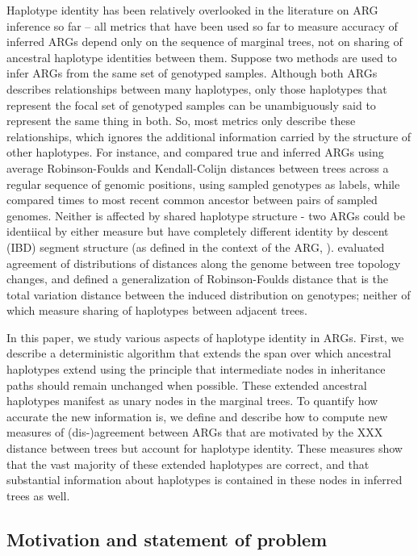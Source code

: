 \documentclass[10pt,twoside,lineno]{gsajnl}
\begin{document}
Haplotype identity has been relatively overlooked in the literature on ARG inference so far --
all metrics that have been used so far to measure accuracy of inferred ARGs
depend only on the sequence of marginal trees,
not on sharing of ancestral haplotype identities between them.
Suppose two methods are used to infer ARGs from the same set of genotyped samples.
Although both ARGs describes relationships between many haplotypes,
only those haplotypes that represent the focal set of genotyped samples
can be unambiguously said to represent the same thing in both.
So, most metrics only describe these relationships,
which ignores the additional information carried by the structure of other haplotypes.
For instance, \citet{kelleher2019inferring} and \citet{zhang2023biobankscale}
compared true and inferred ARGs
using average Robinson-Foulds and Kendall-Colijn distances between trees
across a regular sequence of genomic positions,
using sampled genotypes as labels,
while \citet{brandt2022evaluation} compared times to most recent common ancestor
between pairs of sampled genomes.
Neither is affected by shared haplotype structure -
two ARGs could be identiical by either measure
but have completely different identity by descent (IBD) segment structure
(as defined in the context of the ARG, \citep{XXX}).
\citet{deng2021distribution} evaluated agreement of distributions of
distances along the genome between tree topology changes,
and \citet{zhang2023biobankscale} defined a generalization of Robinson-Foulds distance
that is the total variation distance between the induced distribution on genotypes;
neither of which measure sharing of haplotypes between adjacent trees.

In this paper, we study various aspects of haplotype identity in ARGs.
First, we describe a deterministic algorithm that
extends the span over which ancestral haplotypes extend
using the principle that intermediate nodes in inheritance paths
should remain unchanged when possible.
These extended ancestral haplotypes manifest as unary nodes in the marginal trees.
To quantify how accurate the new information is,
we define and describe how to compute new measures of (dis-)agreement between ARGs
that are motivated by the XXX distance between trees
but account for haplotype identity.
These measures show that the vast majority of these extended haplotypes are correct,
and that substantial information about haplotypes is contained in these nodes
in inferred trees as well.


\subsection{Motivation and statement of problem}
\end{document}
